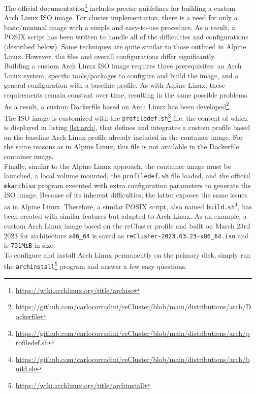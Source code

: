 The official documentation\footnote{\url{https://wiki.archlinux.org/title/archiso}}
includes precise guidelines for building a custom Arch Linux ISO image. For cluster
implementation, there is a need for only a basic/minimal image with a simple and
easy-to-use procedure. As a result, a POSIX script has been written to handle
all of the difficulties and configurations (described below). Some techniques are
quite similar to those outlined in Alpine Linux. However, the files and overall configurations
differ significantly. \\ %
Building a custom Arch Linux ISO image requires three prerequisites: an Arch
Linux system, specific tools/packages to configure and build the image, and a
general configuration with a baseline profile. As with Alpine Linux, these
requirements remain constant over time, resulting in the same possible problems.
As a result, a custom Dockerfile based on Arch Linux has been developed\footnote{\url{https://github.com/carlocorradini/reCluster/blob/main/distributions/arch/Dockerfile}}.
\\ %
The ISO image is customized with the \texttt{profiledef.sh}\footnote{\url{https://github.com/carlocorradini/reCluster/blob/main/distributions/arch/profiledef.sh}}
file, the content of which is displayed in listing \ref{lst:arch}, that defines
and integrates a custom profile based on the baseline Arch Linux profile already
included in the container image. For the same reasons as in Alpine Linux, this
file is not available in the Dockerfile container image. \\ %
Finally, similar to the Alpine Linux approach, the container image must be
launched, a local volume mounted, the \texttt{profiledef.sh} file loaded, and
the official \texttt{mkarchiso} program executed with extra configuration parameters
to generate the ISO image. Because of its inherent difficulties, the latter exposes
the same issues as in Alpine Linux. Therefore, a similar POSIX script, also
named \texttt{build.sh}\footnote{\url{https://github.com/carlocorradini/reCluster/blob/main/distributions/arch/build.sh}},
has been created with similar features but adapted to Arch Linux. As an example,
a custom Arch Linux image based on the reCluster profile and built on March 23rd
2023 for architecture \texttt{x86\_64} is saved as \texttt{reCluster-2023.03.23-x86\_64.iso}
and is \texttt{731MiB} in size. \\ %
To configure and install Arch Linux permanently on the primary disk, simply run
the \texttt{archinstall}\footnote{\url{https://wiki.archlinux.org/title/archinstall}}
program and answer a few easy questions.

